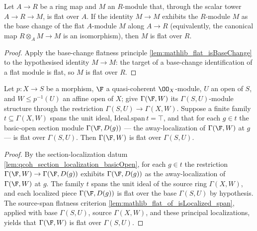 \begin{lemma}
  \label{lem:gf_flat_of_isBaseChange_id}
  Let \(A \to R\) be a ring map and \(M\) an \(R\)-module that, through the scalar tower
  \(A \to R \to M\), is flat over \(A\). If the identity \(M \to M\) exhibits the
  \(R\)-module \(M\) as the base change of the flat \(A\)-module \(M\) along \(A \to R\)
  (equivalently, the canonical map \(R \otimes_A M \to M\) is an isomorphism), then \(M\)
  is flat over \(R\).
\end{lemma}

\begin{proof}
  \leanok
  Apply the base-change flatness principle \cref{lem:mathlib_flat_isBaseChange} to the
  hypothesised identity \(M \to M\): the target of a base-change identification of a flat
  module is flat, so \(M\) is flat over \(R\).
\end{proof}

\begin{lemma}
  \label{lem:gf_section_span_flat_descent}
  Let \(p : X \to S\) be a morphism, \(\F\) a quasi-coherent \(\OO_X\)-module, \(U\) an open
  of \(S\), and \(W \le p^{-1}(U)\) an affine open of \(X\); give \(\Gamma(\F, W)\) its
  \(\Gamma(S, U)\)-module structure through the restriction
  \(\Gamma(S, U) \to \Gamma(X, W)\). Suppose a finite family \(t \subseteq \Gamma(X, W)\)
  spans the unit ideal, \(\mathrm{Ideal.span}\,t = \top\), and that for each \(g \in t\) the
  basic-open section module \(\Gamma(\F, D(g))\) — the away-localization of
  \(\Gamma(\F, W)\) at \(g\) — is flat over \(\Gamma(S, U)\). Then \(\Gamma(\F, W)\) is flat
  over \(\Gamma(S, U)\).
\end{lemma}

\begin{proof}
  \leanok
  By the section-localization datum \cref{lem:qcoh_section_localization_basicOpen}, for each
  \(g \in t\) the restriction \(\Gamma(\F, W) \to \Gamma(\F, D(g))\) exhibits
  \(\Gamma(\F, D(g))\) as the away-localization of \(\Gamma(\F, W)\) at \(g\). The family \(t\) spans the unit ideal of the source ring
  \(\Gamma(X, W)\), and each localized piece \(\Gamma(\F, D(g))\) is flat over the base
  \(\Gamma(S, U)\) by hypothesis. The source-span flatness criterion
  \cref{lem:mathlib_flat_of_isLocalized_span}, applied with base \(\Gamma(S, U)\), source
  \(\Gamma(X, W)\), and these principal localizations, yields that \(\Gamma(\F, W)\) is flat
  over \(\Gamma(S, U)\).
\end{proof}

